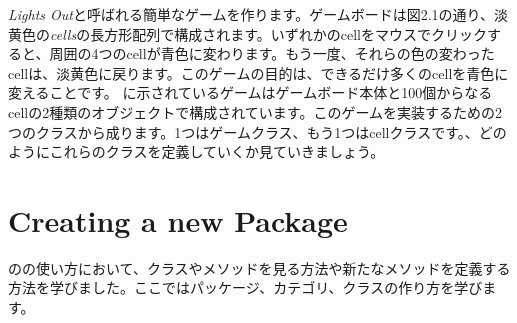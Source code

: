 \documentclass[a4paper,10pt,twoside]{book}
\begin{document}
\emph{Lights Out}と呼ばれる簡単なゲームを作ります。ゲームボードは図2.1の通り、淡黄色の\emph{cells}の長方形配列で構成されます。いずれかのcellをマウスでクリックすると、周囲の4つのcellが青色に変わります。もう一度、それらの色の変わったcellは、淡黄色に戻ります。このゲームの目的は、できるだけ多くのcellを青色に変えることです。
に示されているゲームはゲームボード本体と100個からなるcellの2種類のオブジェクトで構成されています。このゲームを実装するための2つのクラスから成ります。1つはゲームクラス、もう1つはcellクラスです。、どのようにこれらのクラスを定義していくか見ていきましょう。

\section{Creating a new Package}

のの使い方において、クラスやメソッドを見る方法や新たなメソッドを定義する方法を学びました。ここではパッケージ、カテゴリ、クラスの作り方を学びます。

\end{document}
